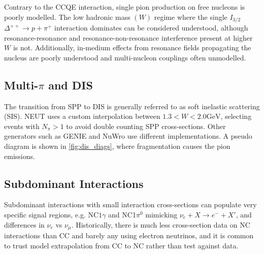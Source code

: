 Contrary to the CCQE interaction, single pion production on free nucleons is poorly modelled. The low hadronic mass $(W)$ regime where the single $I_{3/2}$ $\Delta^{++}\rightarrow p+\pi^+$ interaction dominates can be considered understood, although resonance-resonance and resonance-non-resonance interference present at higher $W$ is not. Additionally, in-medium effects from resonance fields propagating the nucleus are poorly understood and multi-nucleon couplings often unmodelled\cite{nustec,katori_martini}.

\subsection{Multi-$\pi$ and DIS}
The transition from SPP to DIS is generally referred to as soft inelastic scattering (SIS). NEUT uses a custom interpolation between $1.3 < W < 2.0 \text{GeV}$, selecting events with $N_\pi>1$ to avoid double counting SPP cross-sections. Other generators such as GENIE\cite{genie} and NuWro\cite{NuWro} use different implementations. A pseudo diagram is shown in \autoref{fig:dis_diags}, where fragmentation causes the pion emissions.

\subsection{Subdominant Interactions}
Subdominant interactions with small interaction cross-sections can populate very specific signal regions, e.g. NC$1\gamma$ and NC1$\pi^0$ mimicking $\nu_e + X\rightarrow e^- + X'$, and differences in $\nu_e$ vs $\nu_\mu$. Historically, there is much less cross-section data on NC interactions than CC and barely any using electron neutrinos, and it is common to trust model extrapolation from CC to NC rather than test against data. 

